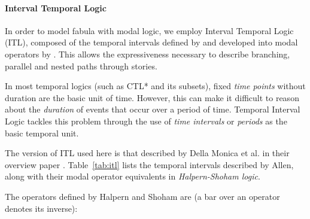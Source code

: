 \documentclass[11pt]{report}
\begin{document}
\paragraph{Interval Temporal Logic}
In order to model fabula with modal logic, we employ Interval Temporal Logic (ITL), composed of the temporal intervals defined by \citet{allen1983maintaining} and developed into modal operators by \citet{halpern1991propositional}. This allows the expressiveness necessary to describe branching, parallel and nested paths through stories.

In most temporal logics (such as CTL* and its subsets), fixed \emph{time points} without duration are the basic unit of time. However, this can make it difficult to reason about the \emph{duration} of events that occur over a period of time. Temporal Interval Logic tackles this problem through the use of \emph{time intervals} or \emph{periods} as the basic temporal unit.

The version of ITL used here is that described by Della Monica et al. in their overview paper \citep{della2013interval}. Table~\ref{tab:itl} lists the temporal intervals described by Allen, along with their modal operator equivalents in \emph{Halpern-Shoham logic}.

The operators defined by Halpern and Shoham are (a bar over an operator denotes its inverse):
\end{document}
